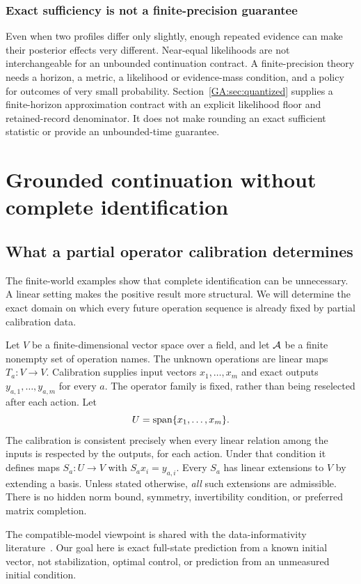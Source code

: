 \subsection{Exact sufficiency is not a finite-precision guarantee}
Even when two profiles differ only slightly, enough repeated evidence can make their posterior effects very different. Near-equal likelihoods are not interchangeable for an unbounded continuation contract. A finite-precision theory needs a horizon, a metric, a likelihood or evidence-mass condition, and a policy for outcomes of very small probability. Section~\ref{GA:sec:quantized} supplies a finite-horizon approximation contract with an explicit likelihood floor and retained-record denominator. It does not make rounding an exact sufficient statistic or provide an unbounded-time guarantee.


\FloatBarrier
\chapter{Grounded continuation without complete identification}\label{GA:book:chapter-28}

\section{What a partial operator calibration determines}\label{GA:sec:linear}
The finite-world examples show that complete identification can be unnecessary. A linear setting makes the positive result more structural. We will determine the exact domain on which every future operation sequence is already fixed by partial calibration data.

Let $V$ be a finite-dimensional vector space over a field, and let $\mathcal A$ be a finite nonempty set of operation names. The unknown operations are linear maps $T_a:V\to V$. Calibration supplies input vectors $x_1,\ldots,x_m$ and exact outputs $y_{a,1},\ldots,y_{a,m}$ for every $a$. The operator family is fixed, rather than being reselected after each action. Let
\[
U=\operatorname{span}\{x_1,\ldots,x_m\}.
\]
The calibration is consistent precisely when every linear relation among the inputs is respected by the outputs, for each action. Under that condition it defines maps $S_a:U\to V$ with $S_ax_i=y_{a,i}$. Every $S_a$ has linear extensions to $V$ by extending a basis. Unless stated otherwise, \emph{all} such extensions are admissible. There is no hidden norm bound, symmetry, invertibility condition, or preferred matrix completion.

The compatible-model viewpoint is shared with the data-informativity literature~\cite{GA:informativity}. Our goal here is exact full-state prediction from a known initial vector, not stabilization, optimal control, or prediction from an unmeasured initial condition.

